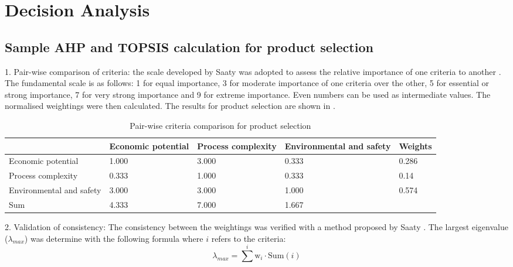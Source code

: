 \section{Decision Analysis}
\label{app:matrix}

\subsection{Sample AHP and TOPSIS calculation for product selection}

1. Pair-wise comparison of criteria: the scale developed by Saaty was adopted to assess the relative importance of one criteria to another \cite{saaty_analytic_1987}. The fundamental scale is as follows: 1 for equal importance, 3 for moderate importance of one criteria over the other, 5 for essential or strong importance, 7 for very strong importance and 9 for extreme importance. Even numbers can be used as intermediate values. The normalised weightings were then calculated. The results for product selection are shown in .

\begin{table}[H]
\centering
\caption{Pair-wise criteria comparison for product selection}
\label{tab:pairwise}
\begin{tabular}{p{4cm}|p{3cm}|p{3cm}|p{3cm}|p{1cm}}
\cline{2-5}
                                                                & Economic potential & Process complexity & Environmental and safety & Weights \\ \hline
Economic potential                        & 1.000              & 3.000              & 0.333                    & 0.286   \\ \hline
Process complexity                      & 0.333              & 1.000              & 0.333                    & 0.14    \\ \hline
Environmental and   safety & 3.000              & 3.000              & 1.000                    & 0.574   \\ \hline
Sum                                      & 4.333              & 7.000              & 1.667                    &                              \\ \cline{1-4}
\end{tabular}
\end{table}


2. Validation of consistency: The consistency between the weightings was verified with a method proposed by Saaty \cite{saaty_analytic_1987}. The largest eigenvalue ($\lambda_{max}$) was determine with the following formula where $i$ refers to the criteria:
\begin{equation}
    \lambda_{max}=\sum^{i} \mathrm{w}_{i}\cdot \mathrm{Sum}(i)
\end{equation}

